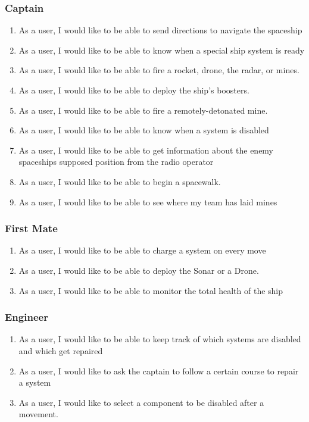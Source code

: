 \subsubsection*{Captain}
\begin{enumerate}[resume, leftmargin=\listmargin]
\item As a user, I would like to be able to send directions to navigate the spaceship
\item As a user, I would like to be able to know when a special ship system is ready 
\item As a user, I would like to be able to fire a rocket, drone, the radar, or mines.
\item As a user, I would like to be able to deploy the ship's boosters.
\item As a user, I would like to be able to fire a remotely-detonated mine.
\item As a user, I would like to be able to know when a system is disabled
\item As a user, I would like to be able to get information about the enemy spaceships supposed position from the radio operator
\item As a user, I would like to be able to begin a spacewalk.
\item As a user, I would like to be able to see where my team has laid mines
\end{enumerate}
\subsubsection*{First Mate}
\begin{enumerate}[resume, leftmargin=\listmargin]
\item As a user, I would like to be able to charge a system on every move
\item As a user, I would like to be able to deploy the Sonar or a Drone.
\item As a user, I would like to be able to monitor the total health of the ship
\end{enumerate}
\subsubsection*{Engineer}
\begin{enumerate}[resume, leftmargin=\listmargin]
\item As a user, I would like to be able to keep track of which systems are disabled and which get repaired
\item As a user, I would like to ask the captain to follow a certain course to repair a system
\item As a user, I would like to select a component to be disabled after a movement.
\end{enumerate}
